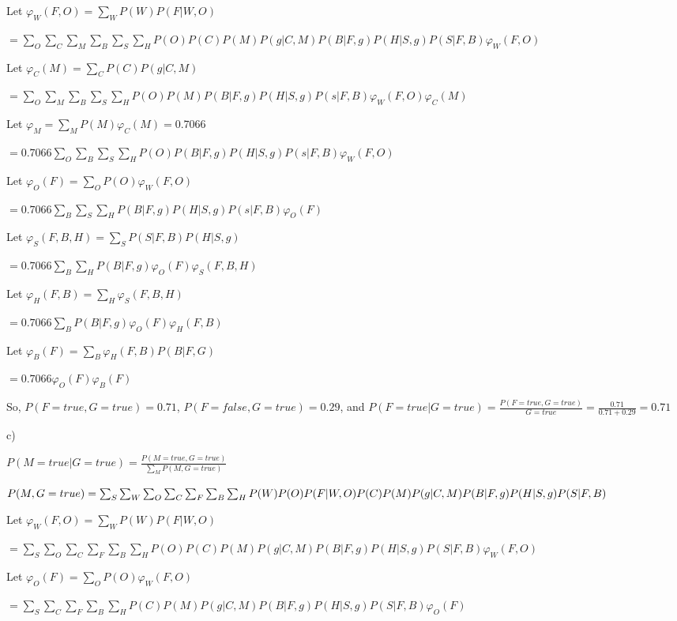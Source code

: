\documentclass[12pt]{article}
\begin{document}
Let $\varphi_W(F, O) = \sum_W P(W)P(F \vert W, O)$

$= \sum_O\sum_C\sum_M\sum_B\sum_S\sum_H P(O)P(C)P(M)P(g \vert C, M)P(B \vert F, g)P(H \vert S, g)P(S \vert F, B)\varphi_W(F, O)$

Let $\varphi_C(M) = \sum_C P(C)P(g \vert C, M)$

$= \sum_O\sum_M\sum_B\sum_S\sum_H P(O)P(M)P(B \vert F, g)P(H \vert S, g)P(s \vert F, B)\varphi_W(F, O)\varphi_C(M)$

Let $\varphi_M = \sum_M P(M)\varphi_C(M) = 0.7066$

$= 0.7066\sum_O\sum_B\sum_S\sum_H P(O)P(B \vert F, g)P(H \vert S, g)P(s \vert F, B)\varphi_W(F, O)$

Let $\varphi_O(F) = \sum_O P(O)\varphi_W(F, O)$

$= 0.7066\sum_B\sum_S\sum_H P(B \vert F, g)P(H \vert S, g)P(s \vert F, B)\varphi_O(F)$

Let $\varphi_S(F, B, H) = \sum_S P(S\vert F, B)P(H \vert S, g)$

$= 0.7066\sum_B\sum_H P(B \vert F, g)\varphi_O(F)\varphi_S(F, B, H)$

Let $\varphi_H(F, B) = \sum_H \varphi_S(F, B, H)$

$= 0.7066\sum_B P(B \vert F, g)\varphi_O(F)\varphi_H(F, B)$

Let $\varphi_B(F) = \sum_B \varphi_H(F, B)P(B \vert F, G)$

$= 0.7066\varphi_O(F)\varphi_B(F)$

So, $P(F = true, G = true) = 0.71$, $P(F = false, G = true) = 0.29$, and $P(F = true \vert G = true) = \frac{P(F = true, G = true)}{G = true} = \frac{0.71}{0.71 + 0.29} = \mathbf{0.71}$

c) 

$P(M = true \vert G = true) = \frac{P(M = true, G = true)}{\sum_M P(M, G = true)}$

$P(M, G = true) = \sum_S\sum_W\sum_O\sum_C\sum_F\sum_B\sum_H P(W)P(O)P(F\vert W, O)P(C)P(M)P(g \vert C, M)\\P(B \vert F, g)P(H \vert S, g)P(S \vert F, B)$

Let $\varphi_W(F, O) = \sum_W P(W)P(F \vert W, O)$

$= \sum_S\sum_O\sum_C\sum_F\sum_B\sum_H P(O)P(C)P(M)P(g \vert C, M)P(B \vert F, g)P(H \vert S, g)P(S \vert F, B)\varphi_W(F, O)$

Let $\varphi_O(F) = \sum_O P(O)\varphi_W(F, O)$

$= \sum_S\sum_C\sum_F\sum_B\sum_H P(C)P(M)P(g \vert C, M)P(B \vert F, g)P(H \vert S, g)P(S \vert F, B)\varphi_O(F)$
\end{document}
